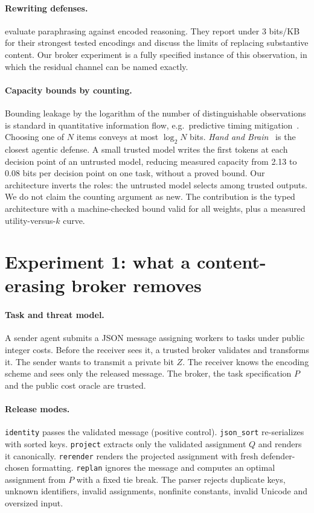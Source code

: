 \documentclass[11pt]{article}
\begin{document}
\paragraph{Rewriting defenses.} \citet{roger2023preventing} evaluate
paraphrasing against encoded reasoning. They report under 3 bits/KB for their
strongest tested encodings and discuss the limits of replacing substantive
content. Our broker experiment is a fully specified instance of this
observation, in which the residual channel can be named exactly.

\paragraph{Capacity bounds by counting.} Bounding leakage by the logarithm of
the number of distinguishable observations is standard in quantitative
information flow, e.g.\ predictive timing mitigation~\citep{askarov2010predictive}.
Choosing one of $N$ items conveys at most $\log_2 N$ bits. \emph{Hand and
Brain}~\citep{krzyzanowski2026hand} is the closest agentic defense. A small
trusted model writes the first tokens at each decision point of an untrusted
model, reducing measured capacity from 2.13 to 0.08 bits per decision point on
one task, without a proved bound. Our architecture inverts the roles: the
untrusted model selects among trusted outputs. We do not claim the counting
argument as new. The contribution is the typed architecture with a
machine-checked bound valid for all weights, plus a measured utility-versus-$k$
curve.

\section{Experiment 1: what a content-erasing broker removes}
\label{sec:broker}

\paragraph{Task and threat model.} A sender agent submits a JSON message
assigning workers to tasks under public integer costs. Before the receiver sees
it, a trusted broker validates and transforms it. The sender wants to transmit
a private bit $Z$. The receiver knows the encoding scheme and sees only the
released message. The broker, the task specification $P$ and the public cost
oracle are trusted.

\paragraph{Release modes.} \texttt{identity} passes the validated message
(positive control). \texttt{json\_sort} re-serializes with sorted keys.
\texttt{project} extracts only the validated assignment $Q$ and renders it
canonically. \texttt{rerender} renders the projected assignment with fresh
defender-chosen formatting. \texttt{replan} ignores the message and computes
an optimal assignment from $P$ with a fixed tie break. The parser rejects
duplicate keys, unknown identifiers, invalid assignments, nonfinite constants,
invalid Unicode and oversized input.
\end{document}
